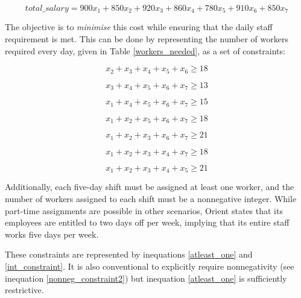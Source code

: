 \documentclass[11pt, a4paper]{article}
\begin{document}
    \begin{equation}
        total\_salary = 900x_1 + 850x_2 + 920x_3 + 860x_4 + 780x_5 + 910x_6 + 850x_7
        \label{obj_func2}
    \end{equation}

    The objective is to \textit{minimise} this cost while ensuring that the daily staff requirement is met. This can be done by representing the number of workers required every day, given in Table \ref{workers_needed}, as a set of constraints:

    \begin{equation}
        x_2 + x_3 + x_4 + x_5 + x_6 \geq 18   
        \label{first_constraint2}     
    \end{equation}

    \begin{equation}
        x_3 + x_4 + x_5 + x_6 + x_7 \geq 13
    \end{equation}

    \begin{equation}
        x_1 + x_4 + x_5 + x_6 + x_7 \geq 15 
    \end{equation}

    \begin{equation}
        x_1 + x_2 + x_5 + x_6 + x_7 \geq 18
    \end{equation}

    \begin{equation}
        x_1 + x_2 + x_3 + x_6 + x_7 \geq 21
    \end{equation}

    \begin{equation}
        x_1 + x_2 + x_3 + x_4 + x_7 \geq 18
    \end{equation}

    \begin{equation}
        x_1 + x_2 + x_3 + x_4 + x_5 \geq 21
        \label{last_constraint2}
    \end{equation}

    Additionally, each five-day shift must be assigned at least one worker, and the number of workers assigned to each shift must be a nonnegative integer. While part-time assignments are possible in other scenarios, Orient states that its employees are entitled to two days off per week, implying that its entire staff works five days per week.

    These constraints are represented by inequations \ref{atleast_one} and \ref{int_constraint}. It is also conventional to explicitly require nonnegativity (see inequation \ref{nonneg_constraint2}) but inequation \ref{atleast_one} is sufficiently restrictive.
\end{document}
